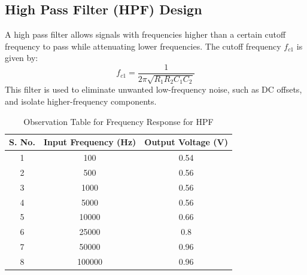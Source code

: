\documentclass[a4paper,12pt]{article}
\begin{document}
\subsection{High Pass Filter (HPF) Design}
A high pass filter allows signals with frequencies higher than a certain cutoff frequency to pass while attenuating lower frequencies. The cutoff frequency $f_{c1}$ is given by:
\begin{equation}
    f_{c1} = \frac{1}{2\pi \sqrt{R_1 R_2 C_1 C_2}}
\end{equation}
This filter is used to eliminate unwanted low-frequency noise, such as DC offsets, and isolate higher-frequency components.
\begin{figure}[H]
    \centering
    \hfill
\end{figure}
\begin{table}[H]
    \centering
    \renewcommand{\arraystretch}{1.3} %
    \begin{tabular}{|c|c|c|}
        \hline
        \textbf{S. No.} & \textbf{Input Frequency (Hz)} &\textbf{Output Voltage (V)} \\
        \hline
        1 & 100 & 0.54  \\
        2 & 500 & 0.56  \\
        3 & 1000 & 0.56  \\
        4 & 5000 & 0.56  \\
        5 & 10000 & 0.66  \\
        6 & 25000 & 0.8  \\
        7 & 50000 & 0.96  \\
        8 & 100000 & 0.96  \\
        \hline
    \end{tabular}
    \caption{Observation Table for Frequency Response for HPF}
    \label{tab:observation}
\end{table}
\end{document}
